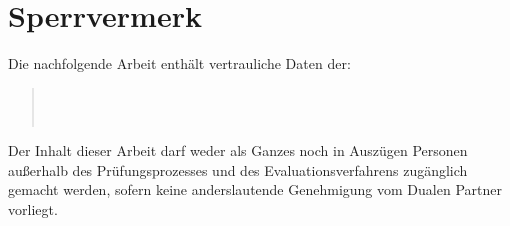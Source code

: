\chapter*{Sperrvermerk}
Die nachfolgende Arbeit enthält vertrauliche Daten der:
\begin{quote}
	\firmaName \\
	\firmaStrasse \\
	\firmaPlz
\end{quote}

\vspace{0.5cm}

Der Inhalt dieser Arbeit darf weder als Ganzes noch in Auszügen Personen außerhalb des Prüfungsprozesses und des Evaluationsverfahrens zugänglich gemacht werden, sofern keine anderslautende Genehmigung vom Dualen Partner vorliegt.
